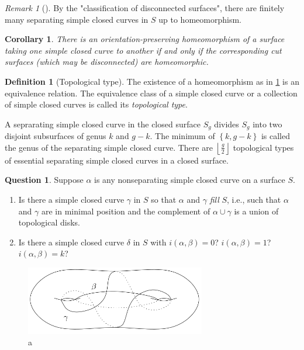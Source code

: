\documentclass[reqno]{amsart}
\newtheorem{corollary}[theorem]{Corollary}
\theoremstyle{definition}
\newtheorem{definition}[theorem]{Definition}
\newtheorem{question}[theorem]{Question}
\theoremstyle{remark}
\newtheorem*{remark}{Remark}
\begin{document}
\begin{remark}[]
    By the "classification of disconnected surfaces", there
    are finitely many separating simple closed curves in $S$ 
    up to homeomorphism.
\end{remark}


\begin{corollary}\label{cut-surface-homeo-1}
    There is an orientation-preserving homeomorphism of a surface
    taking one simple closed curve to another if and only
    if the corresponding cut surfaces (which may be disconnected)
    are homeomorphic.
\end{corollary}

\begin{definition}[Topological type]
    The existence of a homeomorphism as in \ref{cut-surface-homeo-1}
    is an equivalence relation. The equivalence class
    of a simple closed curve or a collection of simple closed
    curves is called its \textit{topological type}.
\end{definition}

A seprarating simple closed curve in the closed surface
$S_g$ divides $S_g$ into two disjoint subsurfaces of genus
$k$ and $g-k$. The minimum of $\left\{ k, g-k \right\} $ is
called the genus of the separating simple closed curve. 
There are $\left\lfloor \frac{g}{2} \right\rfloor$ topological
types of essential separating simple closed curves in
a closed surface.

\begin{question}
    Suppose $\alpha$ is any nonseparating simple closed curve
    on a surface $S$.
    \begin{enumerate}
        \item Is there a simple closed curve
            $\gamma$ in $S$ so that $\alpha$ and $\gamma$ 
            \textit{fill} $S$, i.e., such that
            $\alpha$ and $\gamma$ are in minimal position
            and the complement of $\alpha \cup  \gamma$ is
            a union of topological disks.
        \item Is there a simple closed curve $\delta$ in
            $S$ with $i(\alpha,\beta) = 0$? $i(\alpha,\beta)=1$?
            $i(\alpha,\beta)=k$?
    \end{enumerate}
\end{question}

\begin{figure}[htpb]
    \centering
    \includegraphics[width=0.7\textwidth]{filling-genus-2-surface.png}
    \caption{a}
    \label{fig:filling-genus-2-surface-png}
\end{figure}
\end{document}
